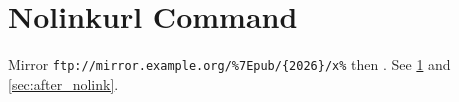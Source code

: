 \documentclass{article}
\begin{document}
\section{Nolinkurl Command}\label{sec:nolinkurl_cmd}
Mirror \nolinkurl{ftp://mirror.example.org/%7Epub/{2026}/x%} then \cite{k1} \label{sec:after_nolink}.
See \ref{sec:nolinkurl_cmd} and \ref{sec:after_nolink}.


\end{document}
